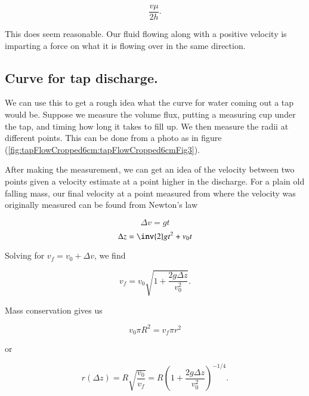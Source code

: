 \begin{equation}\label{eqn:continuumFluidsReview:1470}
\frac{v \mu}{2 h}.
\end{equation}

This does seem reasonable.  Our fluid flowing along with a positive velocity is imparting a force on what it is flowing over in the same direction.

\subsection{Curve for tap discharge.}

We can use this to get a rough idea what the curve for water coming out a tap would be.  Suppose we measure the volume flux, putting a measuring cup under the tap, and timing how long it takes to fill up.  We then measure the radii at different points.  This can be done from a photo as in figure (\ref{fig:tapFlowCropped6cm:tapFlowCropped6cmFig3}).


After making the measurement, we can get an idea of the velocity between two points given a velocity estimate at a point higher in the discharge.  For a plain old falling mass, our final velocity at a point measured from where the velocity was originally measured can be found from Newton's law

\begin{equation}\label{eqn:continuumFluidsReview:1910}
\Delta v = g t
\end{equation}
\begin{equation}\label{eqn:continuumFluidsReview:1930}
\Delta z = \inv{2} g t^2 + v_0 t
\end{equation}

Solving for $v_f = v_0 + \Delta v$, we find

\begin{equation}\label{eqn:continuumFluidsReview:1950}
v_f = v_0 \sqrt{ 1 + \frac{2 g \Delta z}{v_0^2} }.
\end{equation}

Mass conservation gives us

\begin{equation}\label{eqn:continuumFluidsReview:1970}
v_0 \pi R^2 = v_f \pi r^2
\end{equation}

or

\begin{equation}\label{eqn:continuumFluidsReview:1990}
r(\Delta z) = R \sqrt{ \frac{v_0}{v_f} } = R \left( 1 + \frac{2 g \Delta z}{v_0^2} \right)^{-1/4}.
\end{equation}

